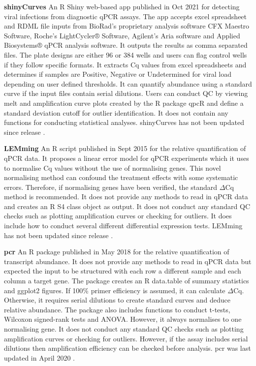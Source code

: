 \documentclass[../main.tex]{subfiles}
\begin{document}
\textbf{shinyCurves} An R Shiny web-based app published in Oct 2021 for detecting viral infections from diagnostic qPCR assays. 
The app accepts excel spreadsheet and RDML file inputs from BioRad's proprietary analysis software CFX Maestro Software, Roche's LightCycler® Software, Agilent's Aria software and Applied Biosystems® qPCR analysis software.
It outputs the results as comma separated files. 
The plate designs are either 96 or 384 wells and users can flag control wells if they follow specific formats. 
It extracts Cq values from excel spreadsheets and determines if samples are Positive, Negative or Undetermined for viral load depending on user defined thresholds. 
It can quantify abundance using a standard curve if the input files contain serial dilutions. 
Users can conduct QC by viewing melt and amplification curve plots created by the R package qpcR and define a standard deviation cutoff for outlier identification.  
It does not contain any functions for conducting statistical analyses. shinyCurves has not been updated since release \parencite{OlaecheaLazaro2021}.

\textbf{LEMming} An R script published in Sept 2015 for the relative quantification of qPCR data. 
It proposes a linear error model for qPCR experiments which it uses to normalise Cq values without the use of normalising genes. 
This novel normalising method can confound the treatment effects with some systematic errors. 
Therefore, if normalising genes have been verified, the standard $\Delta$Cq method is recommended. 
It does not provide any methods to read in qPCR data and creates an R S4 class object as output. 
It does not conduct any standard QC checks such as plotting amplification curves or checking for outliers.  
It does include how to conduct several different differential expression tests. LEMming has not been updated since release \parencite{Feuer2015}.

\textbf{pcr} An R package published in May 2018 for the relative quantification of transcript abundance. 
It does not provide any methods to read in qPCR data but expected the input to be structured with each row a different sample and each column a target gene. 
The package creates an R data.table of summary statistics and ggplot2 figures. 
If 100\% primer efficiency is assumed, it can calculate $\Delta$Cq. 
Otherwise, it requires serial dilutions to create standard curves and deduce relative abundance. 
The package also includes functions to conduct t-tests, Wilcoxon signed-rank tests  and ANOVA.
However, it always normalises to one normalising gene. It does not conduct any standard QC checks such as plotting amplification curves or checking for outliers. 
However, if the assay includes serial dilutions then amplification efficiency can be checked before analysis. 
pcr was last updated in April 2020 \parencite{Ahmed2018}.
\end{document}

